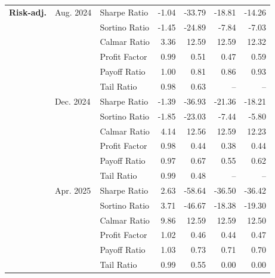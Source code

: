 \begin{table}[H]
{\begin{tabular*}{\textwidth}{@{\extracolsep{\fill}} l l l r r r r}
\textbf{Risk-adj.}
& Aug. 2024 & Sharpe Ratio              & -1.04   & -33.79    & -18.81   & -14.26 \\
&           & Sortino Ratio             & -1.45   & -24.89    & -7.84    & -7.03 \\
&           & Calmar Ratio              & 3.36    & 12.59     & 12.59    & 12.32 \\
&           & Profit Factor             & 0.99    & 0.51      & 0.47     & 0.59 \\
&           & Payoff Ratio              & 1.00    & 0.81      & 0.86     & 0.93 \\
&           & Tail Ratio                & 0.98    & 0.63      & --       & -- \\
& Dec. 2024 & Sharpe Ratio              & -1.39   & -36.93    & -21.36   & -18.21 \\
&           & Sortino Ratio             & -1.85   & -23.03    & -7.44    & -5.80 \\
&           & Calmar Ratio              & 4.14    & 12.56     & 12.59    & 12.23 \\
&           & Profit Factor             & 0.98    & 0.44      & 0.38     & 0.44 \\
&           & Payoff Ratio              & 0.97    & 0.67      & 0.55     & 0.62 \\
&           & Tail Ratio                & 0.99    & 0.48      & --       & -- \\
& Apr. 2025 & Sharpe Ratio              & 2.63     & -58.64    & -36.50    & -36.42 \\
&           & Sortino Ratio             & 3.71     & -46.67    & -18.38    & -19.30 \\
&           & Calmar Ratio              & 9.86     & 12.59     & 12.59     & 12.50 \\
&           & Profit Factor             & 1.02     & 0.46      & 0.44      & 0.47 \\
&           & Payoff Ratio              & 1.03     & 0.73      & 0.71      & 0.70 \\
&           & Tail Ratio                & 0.99     & 0.55      & 0.00      & 0.00 \\
\midrule


\end{tabular*}}
\end{table}

